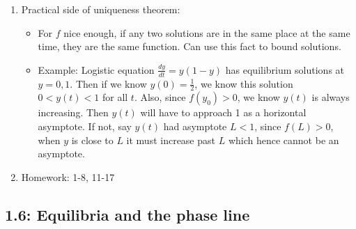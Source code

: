 \documentclass{article}
\begin{document}
\begin{enumerate}
\item Practical side of uniqueness theorem: 
\begin{itemize}
\item For $f$ nice enough, if any two solutions are in the same place at the same time, they are the same function. Can use this fact to bound solutions.
\item Example: Logistic equation $\frac{dy}{dt}=y(1-y)$ has equilibrium solutions at $y=0,1$. Then if we know $y(0)=\frac{1}{2}$, we know this solution $0<y(t)<1$ for all $t$. Also, since $f(y_0)>0$, we know $y(t)$ is always increasing. Then $y(t)$ will have to approach 1 as a horizontal asymptote. If not, say $y(t)$ had asymptote $L<1$, since $f(L)>0$, when $y$ is close to $L$ it must increase past $L$ which hence cannot be an asymptote.
\end{itemize}

\item Homework: 1-8, 11-17

\end{enumerate}


\subsection{1.6: Equilibria and the phase line}
\end{document}
